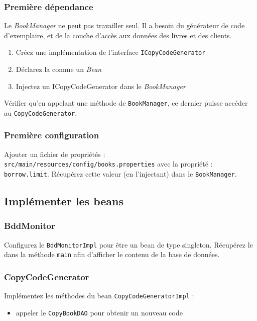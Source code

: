 \documentclass[small,algo]{dushClass}
\begin{document}
\subsubsection{Première dépendance}

Le \emph{BookManager} ne peut pas travailler seul. Il a besoin du générateur de code d'exemplaire, et de la couche d'accès aux données des livres et des clients.\\

\begin{enumerate}
\item Créez une implémentation de l'interface \texttt{ICopyCodeGenerator}
\item Déclarez la comme un \emph{Bean}
\item Injectez un ICopyCodeGenerator dans le \emph{BookManager}\\
\end{enumerate}

Vérifier qu'en appelant une méthode de \texttt{BookManager}, ce dernier puisse accéder au \texttt{CopyCodeGenerator}.

\subsubsection{Première configuration}
Ajouter un fichier de propriétés : \texttt{src/main/resources/config/books.properties} avec la propriété : \texttt{borrow.limit}. Récupérez cette valeur (en l'injectant) dans le \texttt{BookManager}.

\subsection{Implémenter les beans}

\subsubsection{BddMonitor}

Configurez le \texttt{BddMonitorImpl} pour être un bean de type singleton. Récupérez le dans la méthode \texttt{main} afin d'afficher le contenu de la base de données.


\subsubsection{CopyCodeGenerator}

Implémentez les méthodes du bean \texttt{CopyCodeGeneratorImpl} :
\begin{itemize}
\item appeler le \texttt{CopyBookDAO} pour obtenir un nouveau code
\end{itemize}
\end{document}

